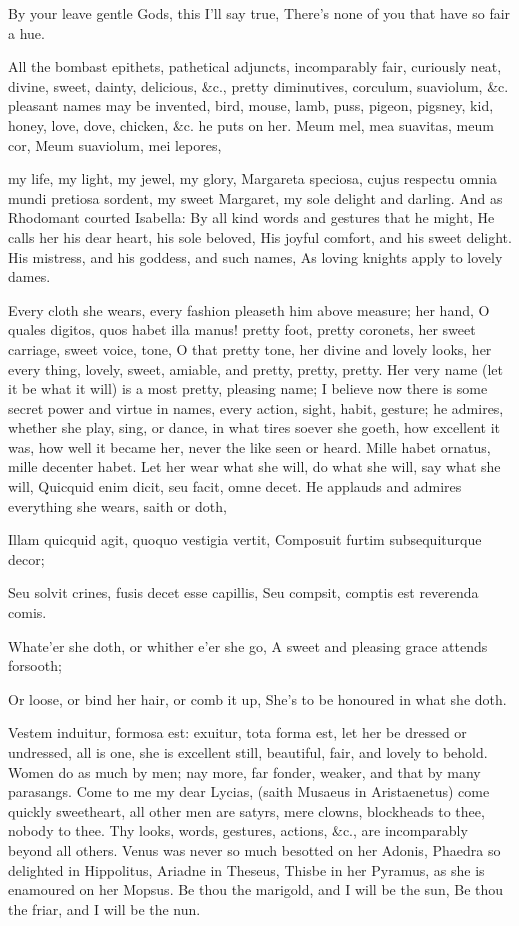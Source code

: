 {By your leave gentle Gods, this I'll say true,
There's none of you that have so fair a hue.

All the bombast epithets, pathetical adjuncts, incomparably fair,
curiously neat, divine, sweet, dainty, delicious, \&c., pretty
diminutives, corculum, suaviolum, \&c. pleasant names may be invented,
bird, mouse, lamb, puss, pigeon, pigsney, kid, honey, love, dove,
chicken, \&c. he puts on her.
Meum mel, mea suavitas, meum cor,
Meum suaviolum, mei lepores,

my life, my light, my jewel, my glory, Margareta speciosa, cujus
respectu omnia mundi pretiosa sordent, my sweet Margaret, my sole
delight and darling. And as Rhodomant courted Isabella:
By all kind words and gestures that he might,
He calls her his dear heart, his sole beloved,
His joyful comfort, and his sweet delight.
His mistress, and his goddess, and such names,
As loving knights apply to lovely dames.

Every cloth she wears, every fashion pleaseth him above measure; her
hand, O quales digitos, quos habet illa manus! pretty foot, pretty
coronets, her sweet carriage, sweet voice, tone, O that pretty tone,
her divine and lovely looks, her every thing, lovely, sweet, amiable,
and pretty, pretty, pretty. Her very name (let it be what it will) is a
most pretty, pleasing name; I believe now there is some secret power
and virtue in names, every action, sight, habit, gesture; he admires,
whether she play, sing, or dance, in what tires soever she goeth, how
excellent it was, how well it became her, never the like seen or heard.
Mille habet ornatus, mille decenter habet. Let her wear what she
will, do what she will, say what she will, Quicquid enim dicit,
seu facit, omne decet. He applauds and admires everything she wears,
saith or doth,

Illam quicquid agit, quoquo vestigia vertit,
Composuit furtim subsequiturque decor;

Seu solvit crines, fusis decet esse capillis,
Seu compsit, comptis est reverenda comis.


Whate'er she doth, or whither e'er she go,
A sweet and pleasing grace attends forsooth;

Or loose, or bind her hair, or comb it up,
She's to be honoured in what she doth.

Vestem induitur, formosa est: exuitur, tota forma est, let her be
dressed or undressed, all is one, she is excellent still, beautiful,
fair, and lovely to behold. Women do as much by men; nay more, far
fonder, weaker, and that by many parasangs. Come to me my dear Lycias,
(saith Musaeus in Aristaenetus) come quickly sweetheart, all
other men are satyrs, mere clowns, blockheads to thee, nobody to thee.
Thy looks, words, gestures, actions, \&c., are incomparably beyond all
others. Venus was never so much besotted on her Adonis, Phaedra so
delighted in Hippolitus, Ariadne in Theseus, Thisbe in her Pyramus, as
she is enamoured on her Mopsus.
Be thou the marigold, and I will be the sun,
Be thou the friar, and I will be the nun.

}
